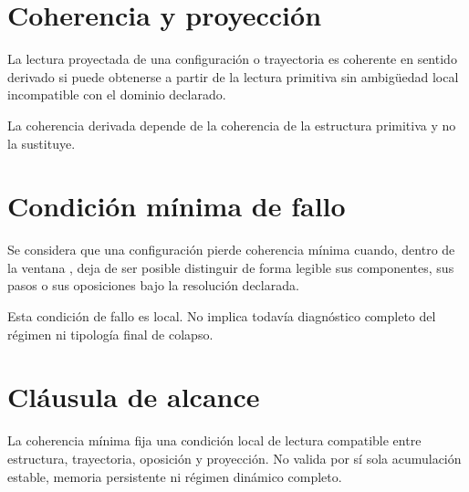 \section{Coherencia y proyección}
\begin{definition}
La lectura proyectada de una configuración o trayectoria es coherente en sentido derivado si puede obtenerse a partir de la lectura primitiva sin ambigüedad local incompatible con el dominio declarado.
\end{definition}

\begin{observation}
La coherencia derivada depende de la coherencia de la estructura primitiva y no la sustituye.
\end{observation}

\section{Condición mínima de fallo}
\begin{definition}
Se considera que una configuración pierde coherencia mínima cuando, dentro de la ventana \Win, deja de ser posible distinguir de forma legible sus componentes, sus pasos o sus oposiciones bajo la resolución declarada.
\end{definition}

\begin{observation}
Esta condición de fallo es local. No implica todavía diagnóstico completo del régimen ni tipología final de colapso.
\end{observation}

\section{Cláusula de alcance}
\begin{observation}
La coherencia mínima fija una condición local de lectura compatible entre estructura, trayectoria, oposición y proyección. No valida por sí sola acumulación estable, memoria persistente ni régimen dinámico completo.
\end{observation}

